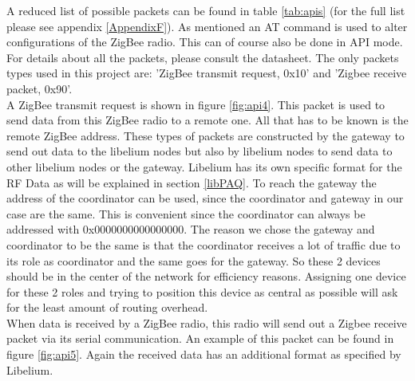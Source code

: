 \label{api1}\noindent
A reduced list of possible packets can be found in table \ref{tab:apis} (for the full list please see appendix \ref{AppendixF}). As mentioned an AT command is used to alter configurations of the ZigBee radio. This can of course also be done in API mode. For details about all the packets, please consult the datasheet. The only packets types used in this project are: 'ZigBee transmit request, 0x10' and 'Zigbee receive packet, 0x90'.\\
A ZigBee transmit request is shown in figure \ref{fig:api4}. This packet is used to send data from this ZigBee radio to a remote one. All that has to be known is the remote ZigBee address. These types of packets are constructed by the gateway to send out data to the libelium nodes but also by libelium nodes to send data to other libelium nodes or the gateway. Libelium has its own specific format for the RF Data as will be explained in section \ref{libPAQ}. To reach the gateway the address of the coordinator can be used, since the coordinator and gateway in our case are the same. This is convenient since the coordinator can always be addressed with 0x0000000000000000. The reason we chose the gateway and coordinator to be the same is that the coordinator receives a lot of traffic due to its role as coordinator and the same goes for the gateway. So these 2 devices should be in the center of the network for efficiency reasons. Assigning one device for these 2 roles and trying to position this device as central as possible will ask for the least amount of routing overhead.\\
When data is received by a ZigBee radio, this radio will send out a Zigbee receive packet via its serial communication. An example of this packet can be found in figure \ref{fig:api5}. Again the received data has an additional format as specified by Libelium.
\vfill 